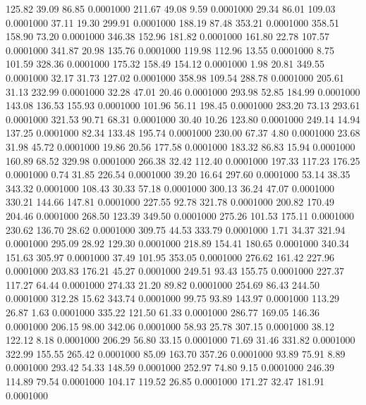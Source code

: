  125.82   39.09   86.85   0.0001000
 211.67   49.08    9.59   0.0001000
  29.34   86.01  109.03   0.0001000
  37.11   19.30  299.91   0.0001000
 188.19   87.48  353.21   0.0001000
 358.51  158.90   73.20   0.0001000
 346.38  152.96  181.82   0.0001000
 161.80   22.78  107.57   0.0001000
 341.87   20.98  135.76   0.0001000
 119.98  112.96   13.55   0.0001000
   8.75  101.59  328.36   0.0001000
 175.32  158.49  154.12   0.0001000
   1.98   20.81  349.55   0.0001000
  32.17   31.73  127.02   0.0001000
 358.98  109.54  288.78   0.0001000
 205.61   31.13  232.99   0.0001000
  32.28   47.01   20.46   0.0001000
 293.98   52.85  184.99   0.0001000
 143.08  136.53  155.93   0.0001000
 101.96   56.11  198.45   0.0001000
 283.20   73.13  293.61   0.0001000
 321.53   90.71   68.31   0.0001000
  30.40   10.26  123.80   0.0001000
 249.14   14.94  137.25   0.0001000
  82.34  133.48  195.74   0.0001000
 230.00   67.37    4.80   0.0001000
  23.68   31.98   45.72   0.0001000
  19.86   20.56  177.58   0.0001000
 183.32   86.83   15.94   0.0001000
 160.89   68.52  329.98   0.0001000
 266.38   32.42  112.40   0.0001000
 197.33  117.23  176.25   0.0001000
   0.74   31.85  226.54   0.0001000
  39.20   16.64  297.60   0.0001000
  53.14   38.35  343.32   0.0001000
 108.43   30.33   57.18   0.0001000
 300.13   36.24   47.07   0.0001000
 330.21  144.66  147.81   0.0001000
 227.55   92.78  321.78   0.0001000
 200.82  170.49  204.46   0.0001000
 268.50  123.39  349.50   0.0001000
 275.26  101.53  175.11   0.0001000
 230.62  136.70   28.62   0.0001000
 309.75   44.53  333.79   0.0001000
   1.71   34.37  321.94   0.0001000
 295.09   28.92  129.30   0.0001000
 218.89  154.41  180.65   0.0001000
 340.34  151.63  305.97   0.0001000
  37.49  101.95  353.05   0.0001000
 276.62  161.42  227.96   0.0001000
 203.83  176.21   45.27   0.0001000
 249.51   93.43  155.75   0.0001000
 227.37  117.27   64.44   0.0001000
 274.33   21.20   89.82   0.0001000
 254.69   86.43  244.50   0.0001000
 312.28   15.62  343.74   0.0001000
  99.75   93.89  143.97   0.0001000
 113.29   26.87    1.63   0.0001000
 335.22  121.50   61.33   0.0001000
 286.77  169.05  146.36   0.0001000
 206.15   98.00  342.06   0.0001000
  58.93   25.78  307.15   0.0001000
  38.12  122.12    8.18   0.0001000
 206.29   56.80   33.15   0.0001000
  71.69   31.46  331.82   0.0001000
 322.99  155.55  265.42   0.0001000
  85.09  163.70  357.26   0.0001000
  93.89   75.91    8.89   0.0001000
 293.42   54.33  148.59   0.0001000
 252.97   74.80    9.15   0.0001000
 246.39  114.89   79.54   0.0001000
 104.17  119.52   26.85   0.0001000
 171.27   32.47  181.91   0.0001000
